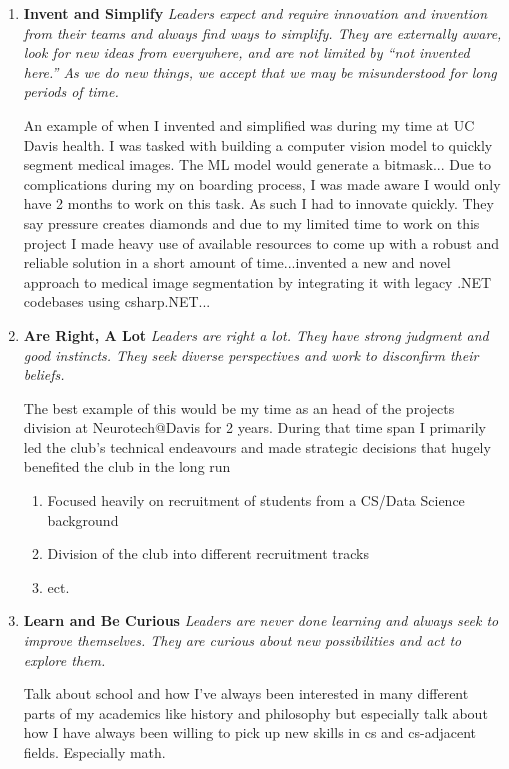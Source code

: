 \documentclass{article}
\begin{document}
\begin{enumerate}
\item \textbf{Invent and Simplify} \textit{Leaders expect and require innovation and invention from their teams and always find ways to simplify. They are externally aware, look for new ideas from everywhere, and are not limited by “not invented here.” As we do new things, we accept that we may be misunderstood for long periods of time.}

An example of when I invented and simplified was during my time at UC Davis health. I was tasked with building a computer vision model to quickly segment medical images. The ML model would generate a bitmask... Due to complications during my on boarding process, I was made aware I would only have 2 months to work on this task. As such I had to innovate quickly. They say pressure creates diamonds and due to my limited time to work on this project I made heavy use of available resources to come up with a robust and reliable solution in a short amount of time...invented a new and novel approach to medical image segmentation by integrating it with legacy .NET codebases using csharp.NET...  

\item \textbf{Are Right, A Lot} \textit{Leaders are right a lot. They have strong judgment and good instincts. They seek diverse perspectives and work to disconfirm their beliefs.}

The best example of this would be my time as an head of the projects division at Neurotech@Davis for 2 years. During that time span I primarily led the club's technical endeavours and made strategic decisions that hugely benefited the club in the long run
\begin{enumerate}
    \item Focused heavily on recruitment of students from a CS/Data Science background
    \item Division of the club into different recruitment tracks
    \item ect.
\end{enumerate}

\item \textbf{Learn and Be Curious} \textit{Leaders are never done learning and always seek to improve themselves. They are curious about new possibilities and act to explore them.}

Talk about school and how I've always been interested in many different parts of my academics like history and philosophy but especially talk about how I have always been willing to pick up new skills in cs and cs-adjacent fields. Especially math.


\end{enumerate}
\end{document}
